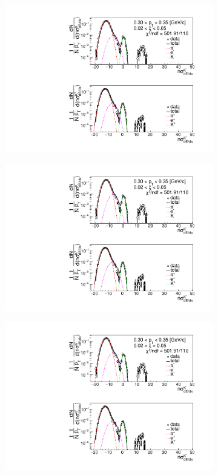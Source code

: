 \begin{figure}[h!]
	\centering
	\begin{subfigure}{.33\textwidth}
		\includegraphics[width=\linewidth, page=1]{chapters/chrgSTAR/img/dEdx/fit2019_thirdStep_1_0.pdf}
	\end{subfigure}
	\begin{subfigure}{.33\textwidth}
		\includegraphics[width=\linewidth, page=2]{chapters/chrgSTAR/img/dEdx/fit2019_thirdStep_1_0.pdf}
	\end{subfigure}
	\begin{subfigure}{.3\textwidth}
		\includegraphics[width=\linewidth, page=3]{chapters/chrgSTAR/img/dEdx/fit2019_thirdStep_1_0.pdf}

\end{subfigure}
\end{figure}
